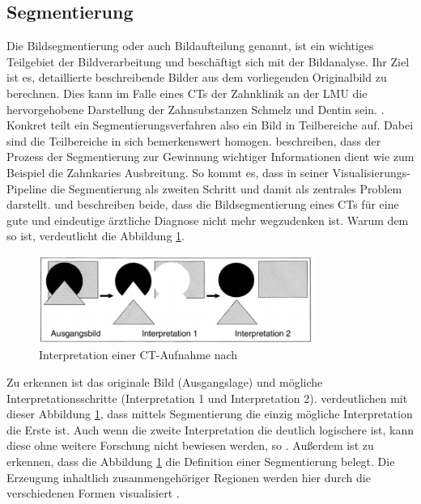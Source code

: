 \subsection{Segmentierung}
\label{subsec:segmentierung} Die Bildsegmentierung oder auch Bildaufteilung
genannt, ist ein wichtiges Teilgebiet der Bildverarbeitung und beschäftigt sich mit
der Bildanalyse. Ihr Ziel ist es, detaillierte beschreibende Bilder aus dem vorliegenden
Originalbild zu berechnen. Dies kann im Falle eines \ac{CT}s der Zahnklinik an
der \ac{LMU} die hervorgehobene Darstellung der Zahnsubstanzen Schmelz und Dentin
sein. \citep[vgl.][S.~359]{lehmann2013bildverarbeitung}. Konkret teilt ein
Segmentierungsverfahren also ein Bild in Teilbereiche auf. Dabei sind die Teilbereiche
in sich bemerkenswert homogen. \citet[S.~1]{ramesh2021} beschreiben, dass der
Prozess der Segmentierung zur Gewinnung wichtiger Informationen dient wie zum
Beispiel die Zahnkaries Ausbreitung. So kommt es, dass \citet[S.~50]{handels2000}
in seiner Visualisierungs-Pipeline die Segmentierung als zweiten Schritt und damit
als zentrales Problem darstellt. \citet[S.~95]{handels2000} und \citet[S.~360]{lehmann2013bildverarbeitung}
beschreiben beide, dass die Bildsegmentierung eines \ac{CT}s für eine gute und eindeutige
ärztliche Diagnose nicht mehr wegzudenken ist. Warum dem so ist, verdeutlicht die
Abbildung \ref{fig:interpretation_einer_ct_aufnahem}.

\begin{figure}[h]
	\centering
	\includegraphics[width=0.8\textwidth]{img/bild_interpretation.jpg}
	\caption{Interpretation einer CT-Aufnahme nach \citet[S.~360]{lehmann2013bildverarbeitung}}
	\label{fig:interpretation_einer_ct_aufnahem}
\end{figure}

Zu erkennen ist das originale Bild (Ausgangslage) und mögliche
Interpretationsschritte (Interpretation 1 und Interpretation 2). \citet[S.~360]{lehmann2013bildverarbeitung}
verdeutlichen mit dieser Abbildung \ref{fig:interpretation_einer_ct_aufnahem}, dass
mittels Segmentierung die einzig mögliche Interpretation die Erste ist. Auch
wenn die zweite Interpretation die deutlich logischere ist, kann diese ohne weitere
Forschung nicht bewiesen werden, so \citet[S.~360]{lehmann2013bildverarbeitung}.
Außerdem ist zu erkennen, dass die Abbildung \ref{fig:interpretation_einer_ct_aufnahem}
die Definition einer Segmentierung belegt. Die Erzeugung inhaltlich
zusammengehöriger Regionen werden hier durch die verschiedenen Formen
visualisiert \citep[vgl.][S.~360]{lehmann2013bildverarbeitung}.

